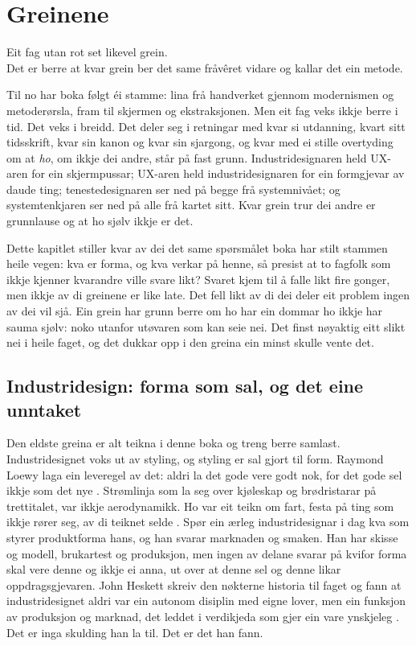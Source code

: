 \chapter{Greinene}

\begin{motto}
Eit fag utan rot set likevel grein.\\ Det er berre at kvar grein ber det same fråvêret vidare og kallar det ein metode.
\end{motto}

Til no har boka følgt éi stamme: lina frå handverket gjennom modernismen og metoderørsla, fram til skjermen og ekstraksjonen. Men eit fag veks ikkje berre i tid. Det veks i breidd. Det deler seg i retningar med kvar si utdanning, kvart sitt tidsskrift, kvar sin kanon og kvar sin sjargong, og kvar med ei stille overtyding om at \emph{ho}, om ikkje dei andre, står på fast grunn. Industridesignaren held UX-aren for ein skjermpussar; UX-aren held industridesignaren for ein formgjevar av daude ting; tenestedesignaren ser ned på begge frå systemnivået; og systemtenkjaren ser ned på alle frå kartet sitt. Kvar grein trur dei andre er grunnlause og at ho sjølv ikkje er det.

Dette kapitlet stiller kvar av dei det same spørsmålet boka har stilt stammen heile vegen: kva er forma, og kva verkar på henne, så presist at to fagfolk som ikkje kjenner kvarandre ville svare likt? Svaret kjem til å falle likt fire gonger, men ikkje av di greinene er like late. Det fell likt av di dei deler eit problem ingen av dei vil sjå. Ein grein har grunn berre om ho har ein dommar ho ikkje har sauma sjølv: noko utanfor utøvaren som kan seie nei. Det finst nøyaktig eitt slikt nei i heile faget, og det dukkar opp i den greina ein minst skulle vente det.

\section{Industridesign: forma som sal, og det eine unntaket}

Den eldste greina er alt teikna i denne boka og treng berre samlast. Industridesignet voks ut av styling, og styling er sal gjort til form. Raymond Loewy laga ein leveregel av det: aldri la det gode vere godt nok, for det gode sel ikkje som det nye \autocite{loewy1951}. Strømlinja som la seg over kjøleskap og brødristarar på trettitalet, var ikkje aerodynamikk. Ho var eit teikn om fart, festa på ting som ikkje rører seg, av di teiknet selde \autocite{meikle1979}. Spør ein ærleg industridesignar i dag kva som styrer produktforma hans, og han svarar marknaden og smaken. Han har skisse og modell, brukartest og produksjon, men ingen av delane svarar på kvifor forma skal vere denne og ikkje ei anna, ut over at denne sel og denne likar oppdragsgjevaren. John Heskett skreiv den nøkterne historia til faget og fann at industridesignet aldri var ein autonom disiplin med eigne lover, men ein funksjon av produksjon og marknad, det leddet i verdikjeda som gjer ein vare ynskjeleg \autocite{heskett1980}. Det er inga skulding han la til. Det er det han fann.

